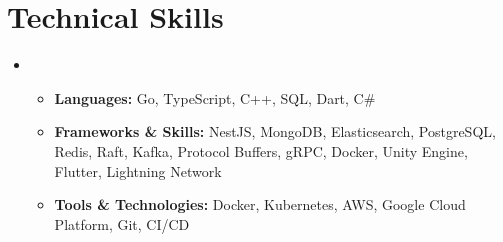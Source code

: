 \documentclass[letterpaper,11pt]{article}
\newcommand{\resumeKVItem}[2]{\item\small{\textbf{#1:} #2}}
\newcommand{\resumeSubHeadingListStart}{\begin{itemize}[leftmargin=0.0in, label={}]}
\newcommand{\resumeSubHeadingListEnd}{\end{itemize}}
\newcommand{\resumeItemListStart}{\begin{itemize}}
\newcommand{\resumeItemListEnd}{\end{itemize}\vspace{-4pt}}
\begin{document}
\section{Technical Skills}
\resumeSubHeadingListStart
  \item
  \resumeItemListStart
      \resumeKVItem{Languages}{Go, TypeScript, C++, SQL, Dart, C\#}
      \resumeKVItem{Frameworks \& Skills}{NestJS, MongoDB, Elasticsearch, PostgreSQL, Redis, Raft, Kafka, Protocol Buffers, gRPC, Docker, Unity Engine, Flutter, Lightning Network}
      \resumeKVItem{Tools \& Technologies}{Docker, Kubernetes, AWS, Google Cloud Platform, Git, CI/CD}
  \resumeItemListEnd
\resumeSubHeadingListEnd
\end{document}
